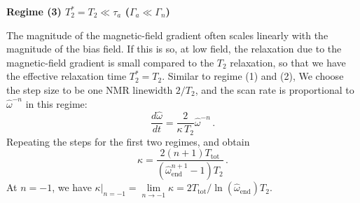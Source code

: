 \textbf{Regime (3) $T_2^*=T_2 \ll \tau_a$ ($\Gamma_a\ll\Gamma_n$)}

The magnitude of the magnetic-field gradient often scales linearly with the magnitude of the bias field. 
If this is so, at low field, the relaxation due to the magnetic-field gradient is small compared to the $T_2$ relaxation, so that we have the effective relaxation time $T_2^*=T_2$. 
Similar to regime (1) and (2), We choose the step size to be one NMR linewidth $2/T_2$, and the scan rate is proportional to $\hat{\omega}^{-n}$ in this regime:
\begin{equation}
    \dfrac{d\hat{\omega}}{dt} =\dfrac{2}{\kappa\, T_2}  \hat{\omega}^{-n}
    \,.
\end{equation}
Repeating the steps for the first two regimes, and obtain
\begin{equation}
    \kappa = \dfrac{2(n+1) T_{\mathrm{tot}}}{(\hat{\omega}_{\mathrm{end}}^{n+1}-1) T_2  }
    \,.\label{eq:kappa_regime4}
\end{equation}
At $n=-1$, we have $\kappa|_{n=-1} = \lim\limits_{n\to-1}\kappa = 2 T_{\mathrm{tot}}/\ln{(\hat{\omega}_{\mathrm{end}})}  T_2 $. 






